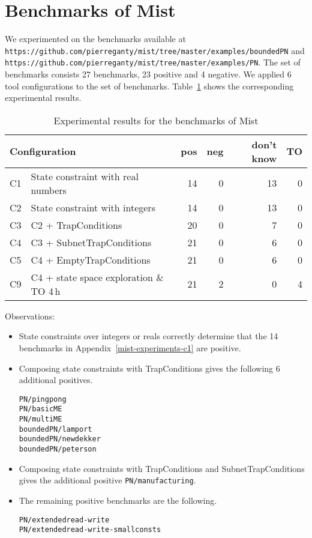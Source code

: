 \documentclass{article}
\newcommand{\mist}{{\sc Mist}}
\newcommand{\ttt}[1]{\texttt{#1}}
\begin{document}
\newpage

\section{Benchmarks of \mist}

We experimented on the benchmarks available at \\
\ttt{https://github.com/pierreganty/mist/tree/master/examples/boundedPN}
and \\
\ttt{https://github.com/pierreganty/mist/tree/master/examples/PN}.
The set of benchmarks consists 27 benchmarks, 23 positive and 4 negative.
We applied 6 tool configurations to the set of benchmarks.
Table~\ref{mist-experiments} shows the corresponding experimental results.

\begin{table}[h]
\begin{center}
  \begin{tabular}{ | r | p{6cm} | r | r | r | r | }
    \hline
    \multicolumn{2}{|l|}{Configuration} & pos & neg & don't know & TO \\
    \hline
    C1 & State constraint with real numbers & 14 &  0 & 13 &  0 \\
    C2 & State constraint with integers     & 14 &  0 & 13 &  0 \\
    \hline
    C3 & C2 + TrapConditions               & 20 &  0 &  7 &  0 \\
    C4 & C3 + SubnetTrapConditions         & 21 &  0 &  6 &  0 \\
    C5 & C4 + EmptyTrapConditions          & 21 &  0 &  6 &  0 \\
    \hline
    C9 & C4 + state space exploration \& TO 4\,h & 21 &  2 & 0 &  4 \\
    \hline
  \end{tabular}
\end{center}
\caption{Experimental results for the benchmarks of \mist}
\label{mist-experiments}
\end{table}

Observations:
\begin{itemize}
\item State constraints over integers or reals correctly determine that the 14 benchmarks in Appendix~\ref{mist-experiments-c1} are positive.
\item Composing state constraints with TrapConditions gives the following 6 additional positives.
\begin{verbatim}
PN/pingpong
PN/basicME
PN/multiME
boundedPN/lamport
boundedPN/newdekker
boundedPN/peterson
\end{verbatim}
\item Composing state constraints with TrapConditions and SubnetTrapConditions gives the additional positive \ttt{PN/manufacturing}.
  \item The remaining positive benchmarks are the following.
\begin{verbatim}
PN/extendedread-write
PN/extendedread-write-smallconsts
\end{verbatim}
\end{itemize}
\end{document}
